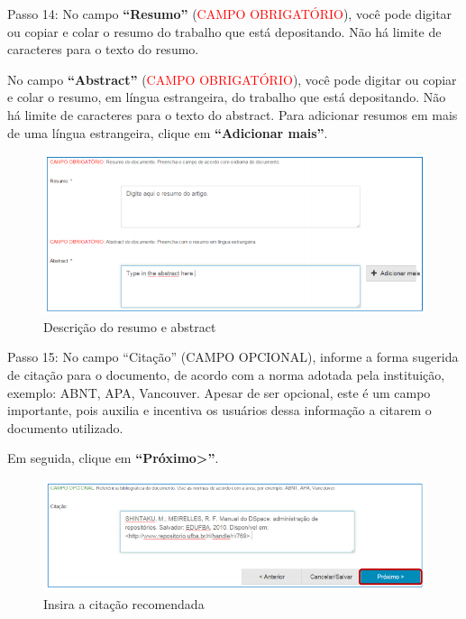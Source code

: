 \documentclass[12pt,hidelinks]{article}
\begin{document}
    Passo 14: No campo \textbf{“Resumo”} (\textcolor{red}{CAMPO OBRIGATÓRIO}), você pode digitar ou copiar e colar o resumo do trabalho que está depositando. Não há limite de caracteres para o texto do resumo.
    
    \singlespacing
    
    No campo \textbf{“Abstract”} (\textcolor{red}{CAMPO OBRIGATÓRIO}), você pode digitar ou copiar e colar o resumo, em língua estrangeira, do trabalho que está depositando. Não há limite de caracteres para o texto do abstract. Para adicionar resumos em mais de uma língua estrangeira, clique em \textbf{“Adicionar mais”}.
    
    \begin{figure}[!htp]
                \centering
                \includegraphics[scale=0.8]{figura/Figura153.png}
                \caption{Descrição do resumo e abstract}
            \label{Rotulo}
        \end{figure}
    
    \singlespacing
    
    Passo 15: No campo “Citação” (CAMPO OPCIONAL), informe a forma sugerida de citação para o documento, de acordo com a norma adotada pela instituição, exemplo: ABNT, APA, Vancouver. Apesar de ser opcional, este é um campo importante, pois auxilia e incentiva os usuários dessa informação a citarem o documento utilizado.
    
\newpage
    
    Em seguida, clique em \textbf{“Próximo>”}.
    
    \begin{figure}[!htp]
                \centering
                \includegraphics[scale=0.8]{figura/Figura154.png}
                \caption{Insira a citação recomendada}
            \label{Rotulo}
        \end{figure}
    
\end{document}
